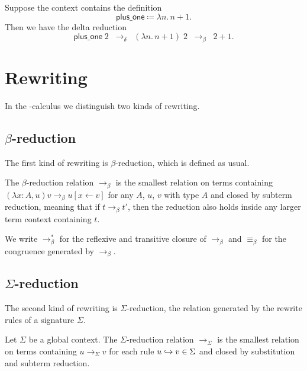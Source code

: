 \begin{example}
Suppose the context contains the definition
\[
\mathsf{plus\_one} \coloneqq \lambda n.\, n + 1.
\]
Then we have the delta reduction
\[
\mathsf{plus\_one}\;2 \;\;\rightarrow_\delta\;\; (\lambda n.\, n + 1)\;2
\;\;\rightarrow_\beta\;\; 2 + 1.
\]
\end{example}

\section{Rewriting}

In the \lpm-calculus we distinguish two kinds of rewriting.

\subsection{\texorpdfstring{$\beta$}{}-reduction}

The first kind of rewriting is $\beta$-reduction, which is defined as usual.

\begin{definition} The $\beta$-reduction relation $\longrightarrow_\beta$ is the smallest relation on terms containing
\( (\lambda x:A, u)v \longrightarrow_\beta u[x \leftarrow v] \) for any $A$, $u$, $v$ with type $A$ and closed by subterm reduction,
meaning that if $t \longrightarrow_\beta t'$, then the reduction also holds inside any larger term context containing $t$.
\end{definition}

\begin{notation}
We write $\longrightarrow^*_\beta$ for the reflexive and transitive closure of $\longrightarrow_\beta$ and $\equiv_\beta$ for the congruence generated by $\longrightarrow_\beta$.
\end{notation}

\subsection{\texorpdfstring{$\Sigma$}{}-reduction}

The second kind of rewriting is $\Sigma$-reduction, the relation generated by the rewrite rules of a signature $\Sigma$.

\begin{definition}
Let $\Sigma$ be a global context. The  $\Sigma$-reduction relation $\longrightarrow_\Sigma$ is the smallest relation on terms containing $u \longrightarrow_\Sigma v$
for each rule $u \hookrightarrow v \in \Sigma$ and closed by substitution and subterm reduction.
\end{definition}

